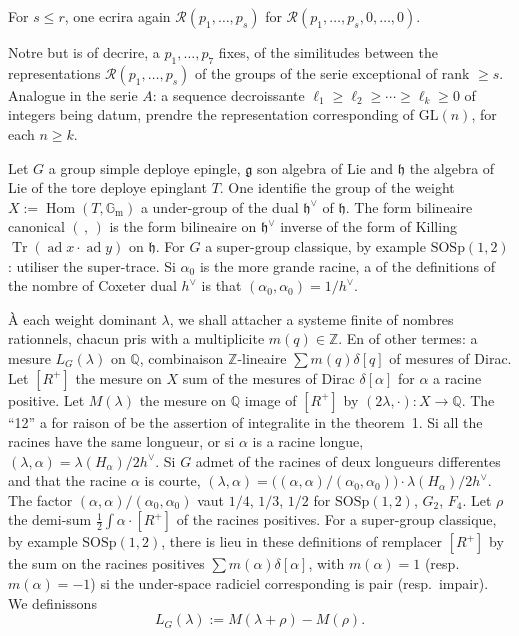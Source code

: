 \documentclass[11pt,a4paper]{article}
\theoremstyle{plain}
\theoremstyle{definition}
\DeclareMathOperator{\Tr}{Tr}
\DeclareMathOperator{\ad}{ad}
\DeclareMathOperator{\Hom}{Hom}
\begin{document}
For $s \leq r$, one ecrira again $\mathcal{R}(p_1,\dots,p_s)$ for $\mathcal{R}(p_1,\dots,p_s,0,\dots,0)$.

Notre but is of decrire, a $p_1,\dots,p_7$ fixes, of the similitudes between the representations $\mathcal{R}(p_1,\dots,p_s)$ of the groups of the serie exceptional of rank $\geq s$. Analogue in the serie $A$: a sequence decroissante $\ell_1 \geq \ell_2 \geq \cdots \geq \ell_k \geq 0$ of integers being datum, prendre the representation corresponding of $\mathrm{GL}(n)$, for each $n \geq k$.

\bigskip

Let $G$ a group simple deploye epingle, $\mathfrak{g}$ son algebra of Lie and $\mathfrak{h}$ the algebra of Lie of the tore deploye epinglant $T$. One identifie the group of the weight $X := \Hom(T,\mathbb{G}_\mathrm{m})$ a under-group of the dual $\mathfrak{h}^\vee$ of $\mathfrak{h}$. The form bilineaire canonical $(\, , \,)$ is the form bilineaire on $\mathfrak{h}^\vee$ inverse of the form of Killing $\Tr(\ad x \cdot \ad y)$ on $\mathfrak{h}$. For $G$ a super-group classique, by example $\mathrm{SOSp}(1,2)$: utiliser the super-trace. Si $\alpha_0$ is the more grande racine, a of the definitions of the nombre of Coxeter dual $h^\vee$ is that $(\alpha_0,\alpha_0) = 1/h^\vee$.

\`A each weight dominant $\lambda$, we shall attacher a systeme finite of nombres rationnels, chacun pris with a multiplicite $m(q) \in \mathbb{Z}$. En of other termes: a mesure $L_G(\lambda)$ on $\mathbb{Q}$, combinaison $\mathbb{Z}$-lineaire $\sum m(q)\delta[q]$ of mesures of Dirac. Let $[R^+]$ the mesure on $X$ sum of the mesures of Dirac $\delta[\alpha]$ for $\alpha$ a racine positive. Let $M(\lambda)$ the mesure on $\mathbb{Q}$ image of $[R^+]$ by $(2\lambda, \cdot): X \to \mathbb{Q}$. The ``12'' a for raison of be the assertion of integralite in the theorem~1. Si all the racines have the same longueur, or si $\alpha$ is a racine longue, $(\lambda,\alpha) = \lambda(H_\alpha)/2h^\vee$. Si $G$ admet of the racines of deux longueurs differentes and that the racine $\alpha$ is courte, $(\lambda,\alpha) = \bigl((\alpha,\alpha)/(\alpha_0,\alpha_0)\bigr) \cdot \lambda(H_\alpha)/2h^\vee$. The factor $(\alpha,\alpha)/(\alpha_0,\alpha_0)$ vaut $1/4$, $1/3$, $1/2$ for $\mathrm{SOSp}(1,2)$, $G_2$, $F_4$. Let $\rho$ the demi-sum $\frac{1}{2}\int \alpha \cdot [R^+]$ of the racines positives. For a super-group classique, by example $\mathrm{SOSp}(1,2)$, there is lieu in these definitions of remplacer $[R^+]$ by the sum on the racines positives $\sum m(\alpha)\delta[\alpha]$, with $m(\alpha) = 1$ (resp.\ $m(\alpha) = -1$) si the under-space radiciel corresponding is pair (resp.\ impair). We definissons
\begin{equation}\label{eq:1}
L_G(\lambda) := M(\lambda+\rho) - M(\rho).
\end{equation}
\end{document}

